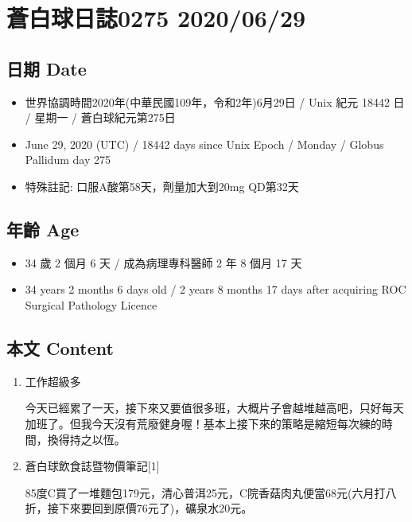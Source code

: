\documentclass[a5paper, 11pt
]{book}
\providecommand{\tightlist}{%
  \setlength{\itemsep}{0pt}\setlength{\parskip}{0pt}}
\begin{document}
\hypertarget{ux84bcux767dux7403ux65e5ux8a8c0275-20200629}{%
\section{蒼白球日誌0275
2020/06/29}\label{ux84bcux767dux7403ux65e5ux8a8c0275-20200629}}

\hypertarget{ux65e5ux671f-date-28}{%
\subsection{日期 Date}\label{ux65e5ux671f-date-28}}

\begin{itemize}
\tightlist
\item
  世界協調時間2020年(中華民國109年，令和2年)6月29日 / Unix 紀元 18442 日
  / 星期一 / 蒼白球紀元第275日
\item
  June 29, 2020 (UTC) / 18442 days since Unix Epoch / Monday / Globus
  Pallidum day 275
\item
  特殊註記: 口服A酸第58天，劑量加大到20mg QD第32天
\end{itemize}

\hypertarget{ux5e74ux9f61-age-28}{%
\subsection{年齡 Age}\label{ux5e74ux9f61-age-28}}

\begin{itemize}
\tightlist
\item
  34 歲 2 個月 6 天 / 成為病理專科醫師 2 年 8 個月 17 天
\item
  34 years 2 months 6 days old / 2 years 8 months 17 days after
  acquiring ROC Surgical Pathology Licence
\end{itemize}

\hypertarget{ux672cux6587-content-28}{%
\subsection{本文 Content}\label{ux672cux6587-content-28}}

\begin{enumerate}
\def\labelenumi{\arabic{enumi}.}
\item
  工作超級多

  今天已經累了一天，接下來又要值很多班，大概片子會越堆越高吧，只好每天加班了。但我今天沒有荒廢健身喔！基本上接下來的策略是縮短每次練的時間，換得持之以恆。
\item
  蒼白球飲食誌暨物價筆記{[}1{]}

  85度C買了一堆麵包179元，清心普洱25元，C院香菇肉丸便當68元(六月打八折，接下來要回到原價76元了)，礦泉水20元。
\end{enumerate}
\end{document}
